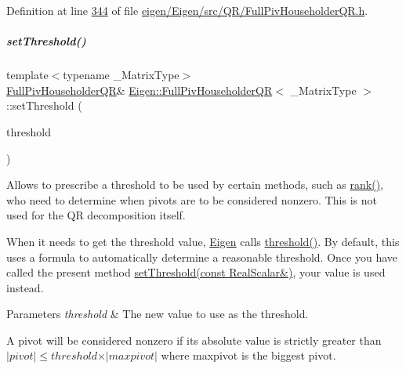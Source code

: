 Definition at line \hyperlink{eigen_2_eigen_2src_2_q_r_2_full_piv_householder_q_r_8h_source_l00344}{344} of file \hyperlink{eigen_2_eigen_2src_2_q_r_2_full_piv_householder_q_r_8h_source}{eigen/\+Eigen/src/\+Q\+R/\+Full\+Piv\+Householder\+Q\+R.\+h}.

\mbox{\label{group___q_r___module_a92277e572bf98245891015d12dd2b602}} 
\subparagraph{\texorpdfstring{set\+Threshold()}{setThreshold()}\hspace{0.1cm}{\footnotesize\ttfamily [2/4]}}
{\footnotesize\ttfamily template$<$typename \+\_\+\+Matrix\+Type$>$ \\
\hyperlink{group___q_r___module_class_eigen_1_1_full_piv_householder_q_r}{Full\+Piv\+Householder\+QR}\& \hyperlink{group___q_r___module_class_eigen_1_1_full_piv_householder_q_r}{Eigen\+::\+Full\+Piv\+Householder\+QR}$<$ \+\_\+\+Matrix\+Type $>$\+::set\+Threshold (\begin{DoxyParamCaption}\item[{const Real\+Scalar \&}]{threshold }\end{DoxyParamCaption})\hspace{0.3cm}{\ttfamily [inline]}}

Allows to prescribe a threshold to be used by certain methods, such as \hyperlink{group___q_r___module_aeae555220f46477818ccc94aca2de770}{rank()}, who need to determine when pivots are to be considered nonzero. This is not used for the QR decomposition itself.

When it needs to get the threshold value, \hyperlink{namespace_eigen}{Eigen} calls \hyperlink{group___q_r___module_af7f6ac15ca19c2b9e45dc3eaae58c201}{threshold()}. By default, this uses a formula to automatically determine a reasonable threshold. Once you have called the present method \hyperlink{group___q_r___module_a92277e572bf98245891015d12dd2b602}{set\+Threshold(const Real\+Scalar\&)}, your value is used instead.


\begin{DoxyParams}{Parameters}
{\em threshold} & The new value to use as the threshold.\\
\hline
\end{DoxyParams}
A pivot will be considered nonzero if its absolute value is strictly greater than $ \vert pivot \vert \leqslant threshold \times \vert maxpivot \vert $ where maxpivot is the biggest pivot.

